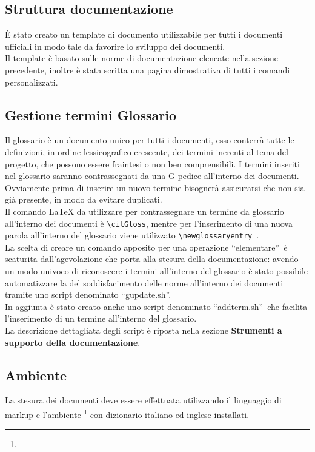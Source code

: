 \documentclass[NormeDiProgetto.tex]{subfiles}
\begin{document}
	\subsection{Struttura documentazione}
	\`{E} stato creato un template di documento utilizzabile per tutti i documenti ufficiali in modo tale da favorire lo sviluppo dei documenti.\\
	Il template è basato sulle norme di documentazione elencate nella sezione precedente, inoltre è stata scritta una pagina dimostrativa di tutti i comandi personalizzati.
	
	\subsection{Gestione termini Glossario}
	Il glossario è un documento unico per tutti i documenti, esso conterrà tutte le definizioni, in ordine lessicografico crescente, dei termini inerenti al tema del progetto, che possono essere fraintesi o non ben comprensibili. I termini inseriti nel glossario saranno contrassegnati da una G pedice all'interno dei documenti.\\
	Ovviamente prima di inserire un nuovo termine bisognerà assicurarsi che non sia già presente, in modo da evitare duplicati. \\
	Il comando \LaTeX{} da utilizzare per contrassegnare un termine da glossario all'interno dei documenti è \texttt{\textbackslash{}citGloss}, mentre per l'inserimento di una nuova parola all'interno del glossario viene utilizzato \texttt{\textbackslash{}newglossaryentry }.\\
	La scelta di creare un comando apposito per una operazione \textquotedblleft elementare\textquotedblright\ è scaturita dall'agevolazione che porta alla stesura della documentazione: avendo un modo univoco di riconoscere i termini all'interno del glossario è stato possibile automatizzare la  del soddisfacimento delle norme all'interno dei documenti tramite uno script denominato \textquotedblleft gupdate.sh\textquotedblright.\\
	In aggiunta è stato creato anche uno script denominato \textquotedblleft addterm.sh\textquotedblright\ che facilita l'inserimento di un termine all'interno del glossario.\\
	La descrizione dettagliata degli script è riposta nella sezione \textbf{Strumenti a supporto della documentazione}.
	
	
	\subsection{Ambiente}
	La stesura dei documenti deve essere effettuata utilizzando il linguaggio di markup  e l'ambiente \footnote{} con dizionario italiano ed inglese installati.
	
\end{document}
